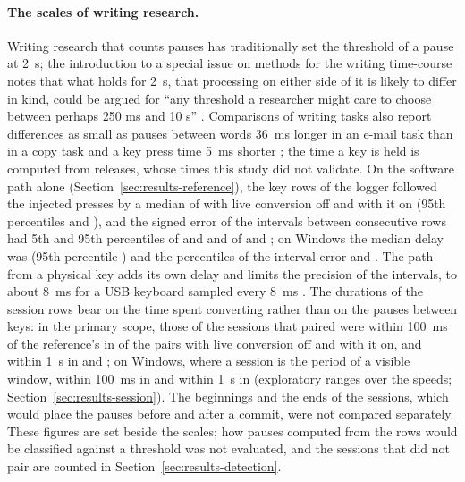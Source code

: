 \paragraph{The scales of writing research.} Writing research that counts pauses has traditionally set the threshold of
a pause at 2~s; the introduction to a special issue on methods for the writing time-course notes that what holds for
2~s, that processing on either side of it is likely to differ in kind, could be argued for ``any threshold a
researcher might care to choose between perhaps 250 ms and 10 s'' \citep{torrance2024}. Comparisons of writing tasks
also report differences as small as pauses between words 36~ms longer in an e-mail task than in a copy task and a key
press time 5~ms shorter \citep[p.~2362]{conijn2019}; the time a key is held is computed
from releases, whose times this study did not validate. On the software path alone
(Section~\ref{sec:results-reference}), the key rows of the logger followed the injected presses by a median of
 with live conversion off and
 with it on (95th percentiles
 and ), and the
signed error of the intervals between consecutive rows had 5th and 95th percentiles of
 and  and of
 and ; on Windows
the median delay was  (95th percentile
) and the percentiles of the interval error
 and . The path from a
physical key adds its own delay and limits the precision of the intervals, to about 8~ms for a USB keyboard sampled
every 8~ms \citep{pinet2017}. The durations of the session rows bear on the time spent converting rather than on the
pauses between keys: in the primary scope, those of the sessions that paired were within 100~ms of the reference's in
 of the pairs with live conversion off and
 with it on, and within 1~s in
 and ; on
Windows, where a session is the period of a visible window, within 100~ms in
 and within 1~s in 
(exploratory ranges over the speeds; Section~\ref{sec:results-session}). The beginnings and the ends of the sessions,
which would place the pauses before and after a commit, were not compared separately. These figures are set beside the
scales; how pauses computed from the rows would be classified against a threshold was not evaluated, and the sessions
that did not pair are counted in Section~\ref{sec:results-detection}.
